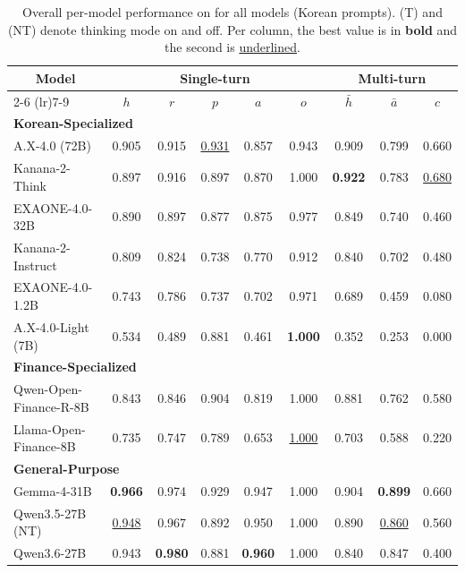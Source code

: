 \begin{table}[t]
\centering
\footnotesize

\caption{Overall per-model performance on \method{} for all models (Korean prompts). (T) and (NT) denote thinking mode on and off. Per column, the best value is in \textbf{bold} and the second is \underline{underlined}.}
\label{tab:overall}

\begin{tabular}{l ccccc ccc}
\toprule
\multicolumn{1}{c}{\multirow{2}{*}{\textbf{Model}}} & \multicolumn{5}{c}{\textbf{Single-turn}} & \multicolumn{3}{c}{\textbf{Multi-turn}} \\
\cmidrule(lr){2-6} \cmidrule(lr){7-9}
 & $h$ & $r$ & $p$ & $a$ & $o$ & $\bar{h}$ & $\bar{a}$ & $c$ \\
\midrule
\multicolumn{9}{l}{\textbf{Korean-Specialized}} \\
\addlinespace[2pt]
A.X-4.0 (72B) & 0.905 & 0.915 & \underline{0.931} & 0.857 & 0.943 & 0.909 & 0.799 & 0.660 \\
Kanana-2-Think & 0.897 & 0.916 & 0.897 & 0.870 & 1.000 & \textbf{0.922} & 0.783 & \underline{0.680} \\
EXAONE-4.0-32B & 0.890 & 0.897 & 0.877 & 0.875 & 0.977 & 0.849 & 0.740 & 0.460 \\
Kanana-2-Instruct & 0.809 & 0.824 & 0.738 & 0.770 & 0.912 & 0.840 & 0.702 & 0.480 \\
EXAONE-4.0-1.2B & 0.743 & 0.786 & 0.737 & 0.702 & 0.971 & 0.689 & 0.459 & 0.080 \\
A.X-4.0-Light (7B) & 0.534 & 0.489 & 0.881 & 0.461 & \textbf{1.000} & 0.352 & 0.253 & 0.000 \\
\midrule
\multicolumn{9}{l}{\textbf{Finance-Specialized}} \\
\addlinespace[2pt]
Qwen-Open-Finance-R-8B & 0.843 & 0.846 & 0.904 & 0.819 & 1.000 & 0.881 & 0.762 & 0.580 \\
Llama-Open-Finance-8B & 0.735 & 0.747 & 0.789 & 0.653 & \underline{1.000} & 0.703 & 0.588 & 0.220 \\
\midrule
\multicolumn{9}{l}{\textbf{General-Purpose}} \\
\addlinespace[2pt]
Gemma-4-31B & \textbf{0.966} & 0.974 & 0.929 & 0.947 & 1.000 & 0.904 & \textbf{0.899} & 0.660 \\
Qwen3.5-27B (NT) & \underline{0.948} & 0.967 & 0.892 & 0.950 & 1.000 & 0.890 & \underline{0.860} & 0.560 \\
Qwen3.6-27B & 0.943 & \textbf{0.980} & 0.881 & \textbf{0.960} & 1.000 & 0.840 & 0.847 & 0.400 \\

\end{tabular}
\end{table}

